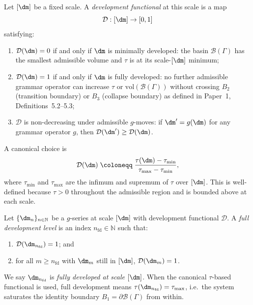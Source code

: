 \begin{definition}\label{def:devfunc}
Let $[\dm]$ be a fixed scale. A \emph{development functional} at
this scale is a map
\[
  \mathcal{D} : [\dm] \to [0, 1]
\]
satisfying:
\begin{enumerate}[label=(\roman*)]
  \item $\mathcal{D}(\dm) = 0$ if and only if $\dm$ is minimally
    developed: the basin $\mathcal{B}(\Gamma)$ has the smallest
    admissible volume and $\tau$ is at its scale-$[\dm]$ minimum;
  \item $\mathcal{D}(\dm) = 1$ if and only if $\dm$ is fully
    developed: no further admissible grammar operator can increase
    $\tau$ or $\mathrm{vol}(\mathcal{B}(\Gamma))$ without crossing
    $B_2$ (transition boundary) or $B_3$ (collapse boundary)
    as defined in Paper~1, Definitions~5.2--5.3;
  \item $\mathcal{D}$ is non-decreasing under admissible $g$-moves:
    if $\dm' = g(\dm)$ for any grammar operator $g$, then
    $\mathcal{D}(\dm') \ge \mathcal{D}(\dm)$.
\end{enumerate}
A canonical choice is
\[
  \mathcal{D}(\dm)
  \;\coloneqq\;
  \frac{\tau(\dm) - \tau_{\min}}{\tau_{\max} - \tau_{\min}},
\]
where $\tau_{\min}$ and $\tau_{\max}$ are the infimum and supremum
of $\tau$ over $[\dm]$. This is well-defined because $\tau > 0$
throughout the admissible region and is bounded above at each scale.
\end{definition}

\begin{definition}\label{def:fdlevel}
Let $\{\dm_n\}_{n \in \mathbb{N}}$ be a $g$-series at scale $[\dm]$
with development functional $\mathcal{D}$. A \emph{full development
level} is an index $n_{\mathrm{fd}} \in \mathbb{N}$ such that:
\begin{enumerate}[label=(\roman*)]
  \item $\mathcal{D}(\dm_{n_{\mathrm{fd}}}) = 1$; and
  \item for all $m \ge n_{\mathrm{fd}}$ with $\dm_m$ still in $[\dm]$,
    $\mathcal{D}(\dm_m) = 1$.
\end{enumerate}
We say $\dm_{n_{\mathrm{fd}}}$ is \emph{fully developed at scale
$[\dm]$}. When the canonical $\tau$-based functional is used, full
development means $\tau(\dm_{n_{\mathrm{fd}}}) = \tau_{\max}$, i.e.\
the system saturates the identity boundary $B_1 =
\partial\mathcal{B}(\Gamma)$ from within.
\end{definition}

